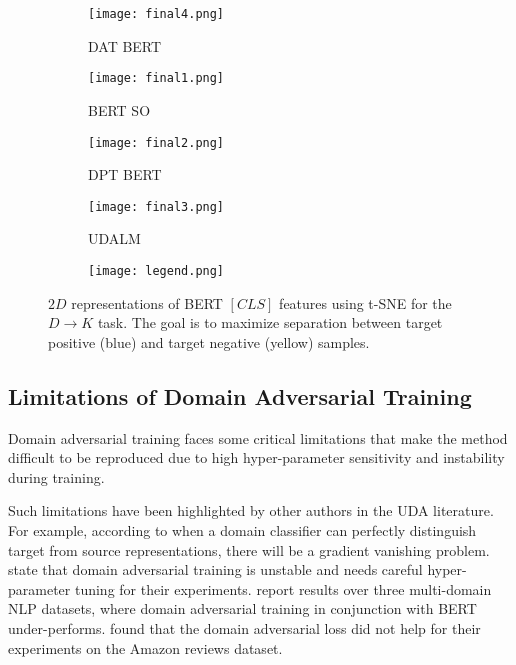 \documentclass[11pt]{article}
\begin{document}
\begin{figure*}[ht]
\centering
\begin{subfigure}[t]{0.34\textwidth}
\centering
         \texttt{[image: final4.png]}
         \caption{DAT BERT}
         \label{fig:advtsne}
\end{subfigure}
\begin{subfigure}[t]{0.34\textwidth}
\centering
         \texttt{[image: final1.png]}
         \caption{BERT SO}
         \label{fig:atsne}
\end{subfigure}

\begin{subfigure}[t]{0.34\textwidth}
\centering
         \texttt{[image: final2.png]}
         \caption{DPT BERT}
         \label{fig:btsne}
\end{subfigure}
\begin{subfigure}[t]{0.34\textwidth}
\centering
         \texttt{[image: final3.png]}
         \caption{UDALM}
         \label{fig:ctsne}
\end{subfigure}
\begin{subfigure}[t]{0.6\textwidth}
\centering
         \texttt{[image: legend.png]}
         \label{fig:leg}
\end{subfigure}
\vspace*{-4mm}
\caption{$2D$ representations of  BERT \([CLS]\) features using t-SNE for the \(D \rightarrow K\) task.
The goal is to maximize separation between target positive (blue) and target negative (yellow) samples.
}
\label{fig:tsne}
\end{figure*}

\subsection{Limitations of Domain Adversarial Training}

Domain adversarial training \citep{ganin2016domain} faces some critical limitations that make the method difficult to be reproduced due to high hyper-parameter sensitivity and instability during training. 

Such limitations have been highlighted by other authors in the UDA literature. For example, according to 
\citet{shen2017wasserstein} when a domain classifier can perfectly distinguish target from source representations, there will be a gradient vanishing problem. \citet{shah-etal-2018-adversarial} state that domain adversarial training is unstable and needs careful hyper-parameter tuning for their experiments. 
\citet{wang2020meta} report results over three multi-domain NLP datasets, where domain adversarial training in conjunction with BERT under-performs. \citet{ruder-plank-2018-strong} found that the domain adversarial loss did not help for their experiments on the Amazon reviews dataset.
\end{document}
